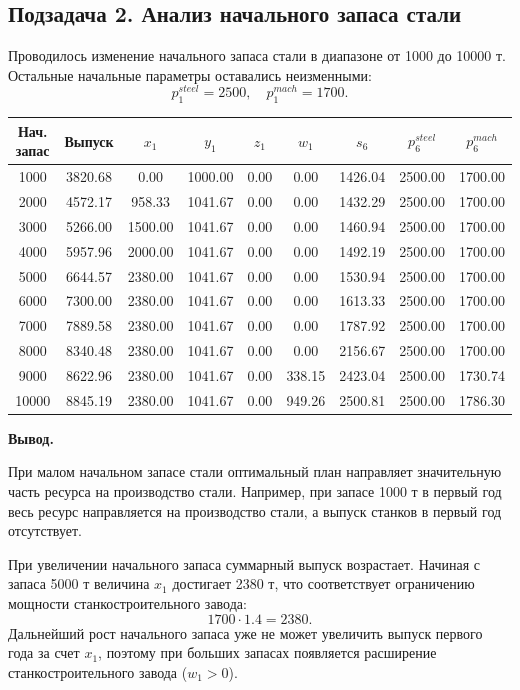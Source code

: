\documentclass[a4paper,12pt]{article}
\begin{document}
\subsection{Подзадача 2. Анализ начального запаса стали}

Проводилось изменение начального запаса стали в диапазоне от 1000 до 10000 т.
Остальные начальные параметры оставались неизменными:
\[
p_1^{steel} = 2500,\quad p_1^{mach} = 1700.
\]

\begin{center}
\small
\begin{tabular}{ccccccccc}
\toprule
Нач. запас & Выпуск & $x_1$ & $y_1$ & $z_1$ & $w_1$ & $s_6$ & $p_6^{steel}$ & $p_6^{mach}$ \\
\midrule
1000 & 3820.68 & 0.00 & 1000.00 & 0.00 & 0.00 & 1426.04 & 2500.00 & 1700.00 \\
2000 & 4572.17 & 958.33 & 1041.67 & 0.00 & 0.00 & 1432.29 & 2500.00 & 1700.00 \\
3000 & 5266.00 & 1500.00 & 1041.67 & 0.00 & 0.00 & 1460.94 & 2500.00 & 1700.00 \\
4000 & 5957.96 & 2000.00 & 1041.67 & 0.00 & 0.00 & 1492.19 & 2500.00 & 1700.00 \\
5000 & 6644.57 & 2380.00 & 1041.67 & 0.00 & 0.00 & 1530.94 & 2500.00 & 1700.00 \\
6000 & 7300.00 & 2380.00 & 1041.67 & 0.00 & 0.00 & 1613.33 & 2500.00 & 1700.00 \\
7000 & 7889.58 & 2380.00 & 1041.67 & 0.00 & 0.00 & 1787.92 & 2500.00 & 1700.00 \\
8000 & 8340.48 & 2380.00 & 1041.67 & 0.00 & 0.00 & 2156.67 & 2500.00 & 1700.00 \\
9000 & 8622.96 & 2380.00 & 1041.67 & 0.00 & 338.15 & 2423.04 & 2500.00 & 1730.74 \\
10000 & 8845.19 & 2380.00 & 1041.67 & 0.00 & 949.26 & 2500.81 & 2500.00 & 1786.30 \\
\bottomrule
\end{tabular}
\end{center}

\textbf{Вывод.}

При малом начальном запасе стали оптимальный план направляет значительную часть
ресурса на производство стали. Например, при запасе 1000 т в первый год весь
ресурс направляется на производство стали, а выпуск станков в первый год
отсутствует.

При увеличении начального запаса суммарный выпуск возрастает. Начиная с запаса
5000 т величина $x_1$ достигает 2380 т, что соответствует ограничению мощности
станкостроительного завода:
\[
1700 \cdot 1.4 = 2380.
\]
Дальнейший рост начального запаса уже не может увеличить выпуск первого года
за счет $x_1$, поэтому при больших запасах появляется расширение
станкостроительного завода ($w_1 > 0$).
\end{document}
